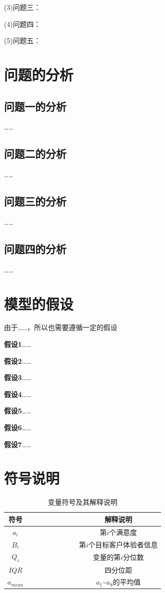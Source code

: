 \documentclass{JXUSTmodeling}
\begin{document}
(3)问题三：

(4)问题四：

(5)问题五：
\section{问题的分析}\label{sec:2}

\subsection{问题一的分析}\label{sub:2.2}
……
\subsection{问题二的分析}\label{sub:2.3}
……
\subsection{问题三的分析}\label{sub:2.4}
……
\subsection{问题四的分析}\label{sub:2.5}
……

\section{模型的假设}\label{sec:3}
由于……，所以也需要遵循一定的假设

\textbf{假设1}……

\textbf{假设2}……

\textbf{假设3}……

\textbf{假设4}……

\textbf{假设5}……

\textbf{假设6}……

\textbf{假设7}……

\section{符号说明}\label{sec:4}
\begin{table}[htbp]
	\centering 
	\caption{\label{tab:symbol}变量符号及其解释说明}
	\begin{tabular}{ccccccccc}
		\toprule[2pt]
		符号 &&&&&&&& 解释说明 \\
		\midrule
		$a_{i}$ &&&&&&&& 第$ i $个满意度\\
		$B_{i}$ &&&&&&&& 第$ i$个目标客户体验者信息\\
		$Q_{i}$ &&&&&&&& 变量的第$ i$分位数\\
		$IQR$ &&&&&&&& 四分位距\\
		$a_{mean}$ &&&&&&&& $ a_{1} $\~{}$ a_{8} $的平均值\\
	
		\bottomrule[2pt]

	\end{tabular}
\end{table}
\end{document}
